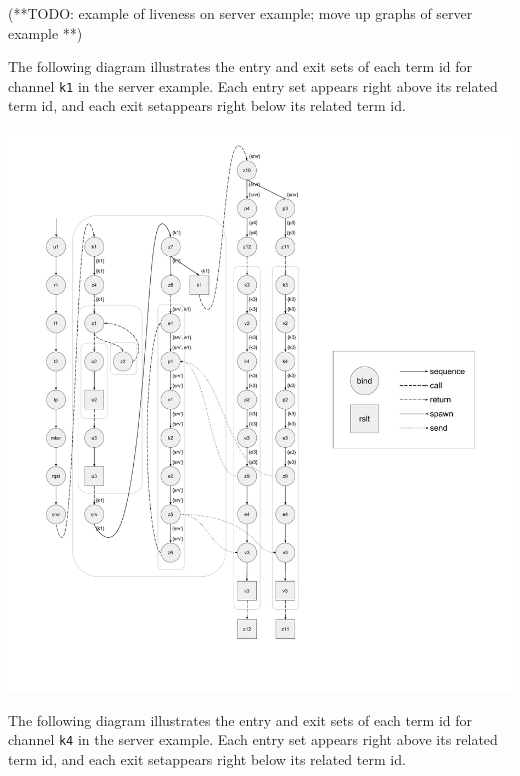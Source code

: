 \documentclass[10pt]{article}
\begin{document}
(**TODO:
example of liveness on server example;
move up graphs of server example 
**)

The following diagram illustrates the entry and exit sets of each term id
for channel \lstinline{k1} in
the server example.  Each entry set appears right above its related term id,
and each exit setappears right below its related term id. 

\includegraphics[width=1.3\textwidth, left]{cml-liveness-analysis-k1.pdf}

The following diagram illustrates the entry and exit sets of each term id
for channel \lstinline{k4} in
the server example.  Each entry set appears right above its related term id,
and each exit setappears right below its related term id. 
\end{document}
